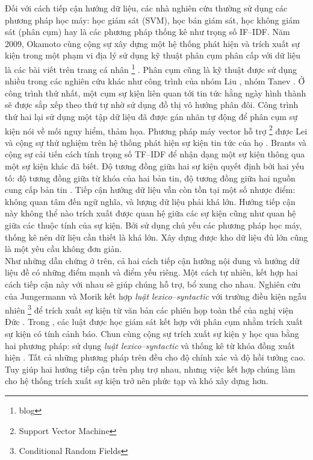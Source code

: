 \noindent Đối với  cách tiếp cận hướng dữ liệu, các nhà nghiên cứu thường sử dụng các phương pháp học máy: học giám sát (SVM), học bán giám sát, học không giám sát (phân cụm) hay là các  phương pháp thống kê như trọng số IF--IDF. Năm 2009, Okamoto cùng cộng sự xây dựng một hệ thống phát hiện và trích xuất sự kiện trong một phạm vi địa lý sử dụng kỹ thuật  phân cụm phân cấp với dữ liệu là các bài viết trên trang cá nhân \footnote{blog} \cite{MM09}. Phân cụm cũng là kỹ thuật được sử dụng nhiều trong các nghiên cứu khác như công trình của nhóm  Liu \cite{MYL08}, nhóm Tanev \cite{HJM08}. Ở công trình thứ nhất, một cụm sự kiện liên quan tới tin tức hằng ngày  hình thành sẽ được sắp xếp theo thứ tự nhờ sử dụng đồ thị vô hướng phân đôi. Công trình thứ hai lại sử dụng một tập dữ liệu đã được gán nhãn tự động để phân cụm sự kiện nói về mối nguy hiểm, thảm họa. Phương pháp máy vector hỗ trợ \footnote{Support Vector Machine} được Lei và cộng sự thử nghiệm trên hệ thống phát hiện sự kiện tin tức của họ \cite{LWZ05}. Brants và cộng sự cải tiến cách tính  trọng số TF--IDF để nhận dạng một sự kiện thông qua một sự kiện khác đã biết. Độ tương đồng giữa hai sự kiện quyết định bởi hai yếu tố: độ tương đồng giữa từ khóa của hai bản tin, độ tương đồng giữa hai nguồn cung cấp bản tin \cite{TFA03}. Tiếp cận hướng dữ liệu vẫn còn tồn tại một số nhược điểm: không quan tâm đến ngữ nghĩa, và lượng dữ liệu phải khá lớn. Hướng tiếp cận này không thể nào trích xuất được quan hệ giữa các sự kiện cũng như quan hệ giữa các thuộc tính của sự kiện. Bởi sử dụng chủ yếu các phương pháp học máy, thống kê nên dữ liệu cần thiết là khá lớn. Xây dựng được kho dữ liệu đủ lớn cũng là một yêu cầu không đơn giản.
\\
\noindent Như những dẫn chứng ở trên, cả hai cách tiếp cận hướng nội dung và hướng dữ liệu đề có những điểm mạnh và điểm yếu riêng. Một cách tự nhiên, kết hợp hai cách tiếp cận này với nhau sẽ giúp chúng hỗ trợ, bổ xung cho nhau. Nghiên cứu của Jungermann và Morik kết hợp \emph{luật lexico--syntactic} với trường điều kiện ngẫu nhiên \footnote{Conditional Random Fields} để trích xuất sự kiện từ văn bản các phiên họp toàn thể của nghị viện Đức \cite{FK08}. Trong \cite{JHP07}, các luật được học giám sát kết hợp với phân cụm nhằm trích xuất sự kiện có tính cảnh báo. Chun cùng cộng sự trích xuất sự kiện y học qua bằng hai phương pháp: sử dụng \emph{luật lexico--syntactic} và thống kê từ khóa đồng xuất hiện \cite{CHR04}. Tất cả những phương pháp trên đều cho độ chính xác và độ hồi tưởng cao. Tuy giúp hai hướng tiếp cận trên phụ trợ nhau, nhưng việc kết hợp chúng làm cho hệ thống trích xuất sự kiện trở nên phức tạp và khó xây dựng hơn.



